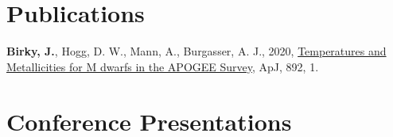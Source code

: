 \documentclass[margin,line]{resume}
\begin{document}
\begin{resume}
\section{\mysidestyle \textcolor{bcolor}{Publications}}




\textbf{Birky, J.}, Hogg, D. W., Mann, A., Burgasser, A. J., 2020, \href{https://arxiv.org/abs/2001.04962}{Temperatures and Metallicities for M dwarfs in the APOGEE Survey}, ApJ, 892, 1. 


\section{\mysidestyle \textcolor{bcolor}{Conference Presentations}}




\end{resume}
\end{document}
